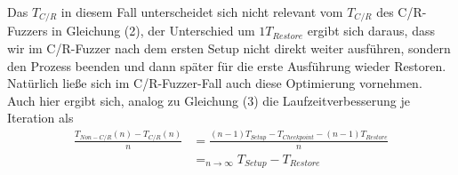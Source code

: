 \documentclass[a4paper]{article}
\begin{document}
Das $T_{C/R}$ in diesem Fall unterscheidet sich nicht relevant vom $T_{C/R}$ des C/R-Fuzzers in Gleichung (2), der Unterschied um $1 T_{Restore}$ ergibt sich daraus, dass wir im C/R-Fuzzer nach dem ersten Setup nicht direkt weiter ausführen, sondern den Prozess beenden und dann später für die erste Ausführung wieder Restoren. Natürlich ließe sich im C/R-Fuzzer-Fall auch diese Optimierung vornehmen.\\
Auch hier ergibt sich, analog zu Gleichung (3) die Laufzeitverbesserung je Iteration als
\begin{equation}
    \begin{split}
        \frac{T_{Non-C/R}(n) - T_{C/R}(n)}{n} &= \frac{(n-1) T_{Setup} - T_{Checkpoint} - (n-1) T_{Restore}}{n} \\
        &=_{n \to \infty} T_{Setup} - T_{Restore}
    \end{split}
\end{equation}
\end{document}

